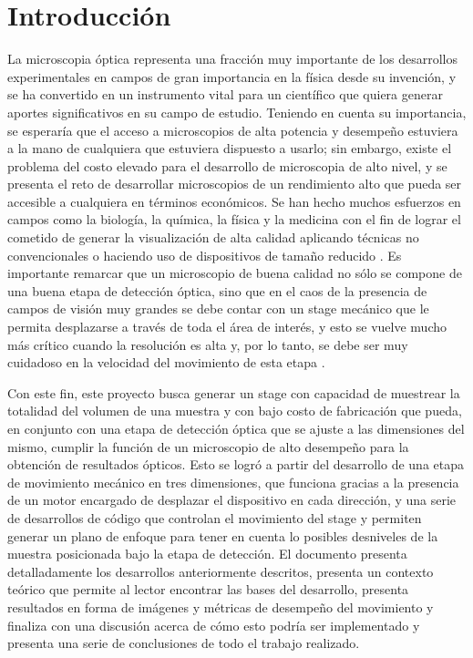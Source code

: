 \chapter{Introducción}\label{ch:introduccion}
La microscopia óptica representa una fracción muy importante de los desarrollos experimentales en campos de gran importancia en la física desde su invención, y se ha convertido en un instrumento vital para un científico que quiera generar aportes significativos en su campo de estudio. Teniendo en cuenta su importancia, se esperaría que el acceso a microscopios de alta potencia y desempeño estuviera a la mano de cualquiera que estuviera dispuesto a usarlo; sin embargo, existe el problema del costo elevado para el desarrollo de microscopia de alto nivel, y se presenta el reto de desarrollar microscopios de un rendimiento alto que pueda ser accesible a cualquiera en términos económicos. Se han hecho muchos esfuerzos en campos como la biología, la química, la física y la medicina con el fin de lograr el cometido de generar la visualización de alta calidad aplicando técnicas no convencionales \cite{Zhang2016} o haciendo uso de dispositivos de tamaño reducido \cite{Coskun2010, Greenbaum2012}. Es importante remarcar que un microscopio de buena calidad no sólo se compone de una buena etapa de detección óptica, sino que en el caos de la presencia de campos de visión muy grandes se debe contar con un stage mecánico que le permita desplazarse a través de toda el área de interés, y esto se vuelve mucho más crítico cuando la resolución es alta y, por lo tanto, se debe ser muy cuidadoso en la velocidad del movimiento de esta  etapa \cite{Abramowitz2015, Kim2008}.

Con este fin, este proyecto busca generar un stage con capacidad de muestrear la totalidad del volumen de una muestra y con bajo costo de fabricación que pueda, en conjunto con una etapa de detección óptica que se ajuste a las dimensiones del mismo, cumplir la función de un microscopio de alto desempeño para la obtención de resultados ópticos. Esto se logró a partir del desarrollo de una etapa de movimiento mecánico en tres dimensiones, que funciona gracias a la presencia de un motor encargado de desplazar el dispositivo en cada dirección, y una serie de desarrollos de código que controlan el movimiento del stage y permiten generar un plano de enfoque para tener en cuenta lo posibles desniveles de la muestra posicionada bajo la etapa de detección. El documento presenta detalladamente los desarrollos anteriormente descritos, presenta un contexto teórico que permite al lector encontrar las bases del desarrollo, presenta resultados en forma de imágenes y métricas de desempeño del movimiento y finaliza con una discusión acerca de cómo esto podría ser implementado y presenta una serie de conclusiones de todo el trabajo realizado.

